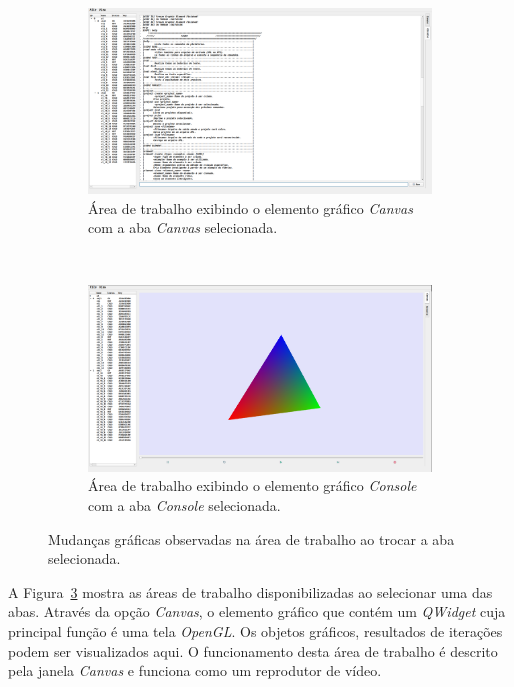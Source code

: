 \documentclass[a4paper,12pt]{monografia}
\theoremstyle{plain}
\theoremstyle{definition}
\theoremstyle{remark}
\begin{document}
\begin{figure}
	\begin{subfigure}{\textwidth}
		\centering
		\includegraphics[width=.9\linewidth]{Figures/IGU_017.png}
		\caption{Área de trabalho exibindo o elemento gráfico \textit{Canvas} com a aba \textit{Canvas} selecionada.}
		\label{fig:sfig1}
	\end{subfigure}%
	\\
	\begin{subfigure}{\textwidth}
		\centering
		\includegraphics[width=.9\linewidth]{Figures/IGU_001.png}
		\caption{Área de trabalho exibindo o elemento gráfico \textit{Console} com a aba \textit{Console} selecionada.}
		\label{fig:sfig2}
	\end{subfigure}
	\caption{Mudanças gráficas observadas na área de trabalho ao trocar a aba selecionada.}
	\label{fig:fig}
\end{figure}

A Figura~\ref{fig:fig} mostra as áreas de trabalho disponibilizadas ao selecionar uma das abas. Através da opção \textit{Canvas}, o elemento gráfico que contém um \textit{QWidget} cuja principal função é uma tela \textit{OpenGL}. Os objetos gráficos, resultados de iterações podem ser visualizados aqui. O funcionamento desta área de trabalho é descrito pela janela \textit{Canvas} e funciona como um 
reprodutor de vídeo.
\end{document}
